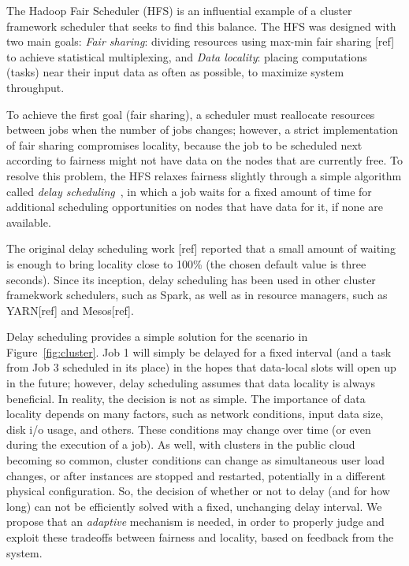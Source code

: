 The Hadoop Fair Scheduler (HFS) is an influential example of a cluster framework 
scheduler that seeks to find this balance. The HFS was designed with two main goals: 
\textit{Fair sharing}: dividing resources using max-min fair sharing [ref] to achieve 
statistical multiplexing, and 
\textit{Data locality}: placing computations (tasks) near their input data as often as
possible, to maximize system throughput.

To achieve the first goal (fair sharing), a scheduler must reallocate resources between 
jobs when the number of jobs changes; however, a strict implementation of fair sharing 
compromises locality, because the job to be scheduled next according to fairness might not
have data on the nodes that are currently free. To resolve this problem, the HFS relaxes 
fairness slightly through a simple algorithm called 
\textit{delay scheduling}~\cite{Zaharia:2010}, in which a 
job waits for a fixed amount of time for additional scheduling opportunities on nodes 
that have data for it, if none are available.

The original delay scheduling work [ref] reported that a small amount of waiting is enough
to bring locality close to 100\% (the chosen default value is three seconds). Since its 
inception, delay scheduling has been used in other cluster framekwork schedulers, such as 
Spark, as well as in resource managers, such as YARN[ref] and Mesos[ref]. 

Delay scheduling provides a simple solution for the scenario in 
Figure~\ref{fig:cluster}. Job 1 will simply be delayed for a fixed interval (and a task
from Job 3 scheduled in its place) in the hopes that data-local slots will open up in 
the future; however, delay scheduling assumes that data locality is always beneficial.
In reality, the decision is not as simple. The importance of data locality depends on many
factors, such as network conditions, input data size, disk i/o usage, and others. These
conditions may change over time (or even during the execution of a job). As well, with clusters
in the public cloud becoming so common, cluster conditions can change as simultaneous user
load changes, or after instances are stopped and restarted, potentially in a different physical
configuration. So, the
decision of whether or not to delay (and for how long) can not be efficiently solved with
a fixed, unchanging delay interval. We propose that an \emph{adaptive} mechanism is needed,
in order to properly judge and exploit these tradeoffs between fairness and locality,
based on feedback from the system.

